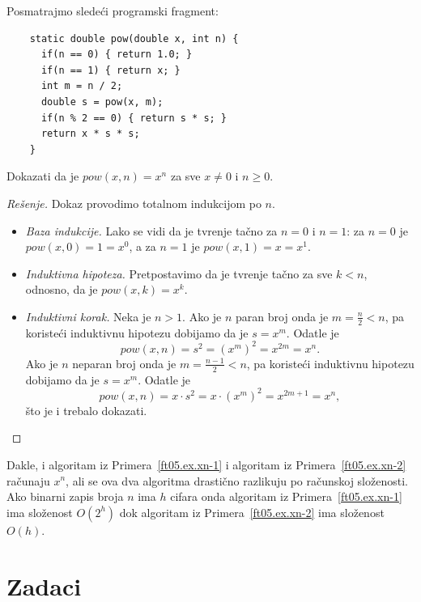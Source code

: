 \begin{EX}\label{ft05.ex.xn-2}
  Posmatrajmo slede\'ci programski fragment:
{\small
\begin{verbatim}
    static double pow(double x, int n) {
      if(n == 0) { return 1.0; }
      if(n == 1) { return x; }
      int m = n / 2;
      double s = pow(x, m);
      if(n % 2 == 0) { return s * s; }
      return x * s * s;
    }
\end{verbatim}
}
\noindent
  Dokazati da je $\mathit{pow}(x, n) = x^n$ za sve $x \ne 0$ i $n \ge 0$.
\end{EX}
\begin{proof}[Re\v senje]
  Dokaz provodimo totalnom indukcijom po $n$.
  \begin{itemize}
  \item
    \emph{Baza indukcije.} Lako se vidi da je tvr\dj enje ta\v cno za $n = 0$ i $n = 1$:
    za $n = 0$ je $\mathit{pow}(x, 0) = 1 = x^0$, a za $n = 1$ je $\mathit{pow}(x, 1) = x = x^1$.
  
  \item
    \emph{Induktivna hipoteza.} Pretpostavimo da je tvr\dj enje ta\v cno za sve $k < n$, odnosno, da je $\mathit{pow}(x, k) = x^k$.
  \item
    \emph{Induktivni korak.} Neka je $n > 1$. Ako je $n$ paran broj onda je $m = \frac n2 < n$, pa koriste\'ci induktivnu hipotezu dobijamo
    da je $s = x^m$. Odatle je
    $$\textstyle
      \mathit{pow}(x, n) = s^2 = (x^m)^2 = x^{2m} = x^n.
    $$
    Ako je $n$ neparan broj onda je $m = \frac{n-1}2 < n$, pa koriste\'ci induktivnu hipotezu dobijamo
    da je $s = x^m$. Odatle je
    $$\textstyle
      \mathit{pow}(x, n) = x \cdot s^2 = x \cdot (x^m)^2 = x^{2m+1} = x^n,
    $$
    \v sto je i trebalo dokazati.
  \end{itemize}
\end{proof}


Dakle, i algoritam iz Primera~\ref{ft05.ex.xn-1} i algoritam iz Primera~\ref{ft05.ex.xn-2} ra\v cunaju $x^n$, ali se ova
dva algoritma drasti\v cno razlikuju po ra\v cunskoj slo\v zenosti. Ako binarni zapis broja $n$ ima $h$ cifara
onda algoritam iz Primera~\ref{ft05.ex.xn-1} ima slo\v zenost $O(2^h)$ dok
algoritam iz Primera~\ref{ft05.ex.xn-2} ima slo\v zenost $O(h)$.



\section{Zadaci}

